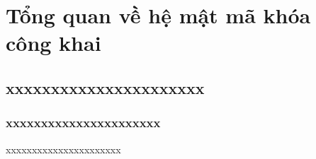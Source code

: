\documentclass{beamer}
\begin{document}
\section{Tổng quan về hệ mật mã khóa công khai}
\subsection{xxxxxxxxxxxxxxxxxxxxxx}
\subsubsection{xxxxxxxxxxxxxxxxxxxxxx}
\begin{frame}{xxxxxxxxxxxxxxxxxxxxxx}

\end{frame}
























\end{document}
